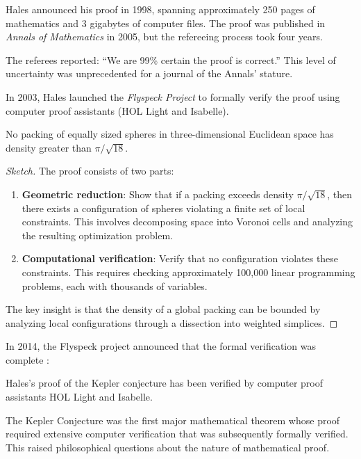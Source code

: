 Hales announced his proof in 1998, spanning approximately 250 pages of mathematics and 3 gigabytes of computer files. The proof was published in \emph{Annals of Mathematics} in 2005, but the refereeing process took four years.

The referees reported: ``We are 99\% certain the proof is correct.'' This level of uncertainty was unprecedented for a journal of the Annals' stature.

In 2003, Hales launched the \emph{Flyspeck Project} to formally verify the proof using computer proof assistants (HOL Light and Isabelle). 

\begin{theorem}
No packing of equally sized spheres in three-dimensional Euclidean space has density greater than $\pi/\sqrt{18}$.
\end{theorem}

\begin{proof}[Sketch]
The proof consists of two parts:
\begin{enumerate}
\item \textbf{Geometric reduction}: Show that if a packing exceeds density $\pi/\sqrt{18}$, then there exists a configuration of spheres violating a finite set of local constraints. This involves decomposing space into Voronoi cells and analyzing the resulting optimization problem.
\item \textbf{Computational verification}: Verify that no configuration violates these constraints. This requires checking approximately 100,000 linear programming problems, each with thousands of variables.
\end{enumerate}
The key insight is that the density of a global packing can be bounded by analyzing local configurations through a dissection into weighted simplices.
\end{proof}

In 2014, the Flyspeck project announced that the formal verification was complete \cite{hales2017}:

\begin{theorem}
Hales's proof of the Kepler conjecture has been verified by computer proof assistants HOL Light and Isabelle.
\end{theorem}

\begin{highlightbox}
The Kepler Conjecture was the first major mathematical theorem whose proof required extensive computer verification that was subsequently formally verified. This raised philosophical questions about the nature of mathematical proof.
\end{highlightbox}

